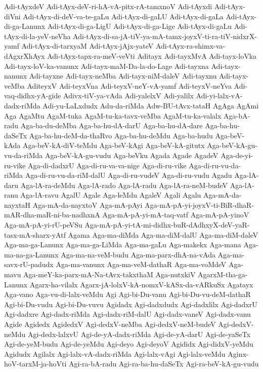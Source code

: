 {Adi-tAyxdeV
Adi-tAyx-deV-ri-hA-vA-pitx-rA-tamxnoV
Adi-tAyxdi
Adi-tAyx-diVni
Adi-tAyx-di-deV-va-te-gaLu
Adi-tAyx-di-gaLU
Adi-tAyx-di-gaLa
Adi-tAyx-di-ga-Lanunx
Adi-tAyx-di-ga-LigU
Adi-tAyx-di-ga-Lige
Adi-tAyx-di-gaLu
Adi-tAyx-di-la-yeV-neVha
Adi-tAyx-di-sa-jA-tiV-ya-mA-tamx-joyxV-ti-ra-tiV-nidxrX-yamf
Adi-tAyx-di-tarxyaM
Adi-tAyx-jAjx-yateV
Adi-tAyx-ra-shimx-va-dAgxrXhAyx
Adi-tAyx-tapx-ra-meV-veVti
Aditayx
Adi-tayxMvA
Adi-tayx-loVka
Adi-tayx-loV-ka-vanunx
Adi-tayx-maM-Da-la-do-Lage
Adi-tayxna
Adi-tayx-nanunx
Adi-tayxne
Adi-tayx-neMba
Adi-tayx-niM-daleV
Adi-tayxnu
Adi-tayx-veMba
AditeyxV
Adi-teyxVna
Adi-teyxV-neY-vA-yamf
Adi-teyxV-neYva
Adi-vaq-didhx-yA-gide
Adivx-tiV-ya-vAda
Adi-yalelxV
Adi-yalilx
Adi-yi-lalx-vA-dadx-riMda
Adi-yu-LaLxdudx
Adu-da-riMda
Adw-BU-tAvx-tataH
AgAga
AgAmi
Aga
AgaMtu
AgaM-tuka
AgaM-tu-ka-tavx-veMba
AgaM-tu-ka-valalx
Aga-bA-radu
Aga-ba-du-deMba
Aga-ba-hu-dA-darU
Aga-ba-hu-dA-dare
Aga-ba-hu-daSeTx
Aga-ba-hu-deM-da-thaRvo
Aga-ba-hu-deMdu
Aga-ba-hudu
Aga-beV-kAda
Aga-beV-kA-diV-teMdu
Aga-beV-kAgi
Aga-beV-kA-gitutx
Aga-beV-kA-gu-vu-da-riMda
Aga-beV-kA-gu-vudu
Aga-beVku
Agada
Agade
AgadeV
Aga-de-yi-ru-vike
Aga-di-dadxrU
Aga-di-ru-va-va-nige
Aga-di-ru-vike
Aga-di-ru-vu-da-riMda
Aga-di-ru-vu-da-riM-dalU
Aga-di-ru-vudeV
Aga-di-ru-vudu
Agadu
Aga-lA-daru
Aga-lA-ra-deMdu
Aga-lA-rado
Aga-lA-radu
Aga-lA-ra-neM-budeV
Aga-lA-ranu
Aga-lA-ravu
AgalU
Agale
Aga-leMdu
AgaleV
Agali
Agalu
Aga-mA-da-nayxtaH
Aga-mA-da-nayxtoV
Aga-mA-pAyi
Aga-mA-pA-yi-joyxV-ti-BiR-dhaR-mAR-dha-maR-ni-ba-nadhxnA
Aga-mA-pA-yi-mA-taq-vatf
Aga-mA-pA-yinoV
Aga-mA-pA-yi-rU-peVSu
Aga-mA-pA-yi-tA-mi-didhx-buR-dAdhxyX-deV-yaR-tasx-mA-sharx-yAtf
Agama
Aga-ma-diMda
Aga-ma-diM-dalU
Aga-ma-diM-daleV
Aga-ma-ga-Lanunx
Aga-ma-ga-LiMda
Aga-ma-gaLu
Aga-makekx
Aga-mana
Aga-ma-na-ga-Lanunx
Aga-ma-na-veM-budu
Aga-ma-parx-dhA-na-vAda
Aga-ma-savx-rU-padudx
Aga-ma-vanunx
Aga-ma-veM-dathaR
Aga-ma-voMdeV
Aga-mavu
Aga-meY-ka-parx-mA-Na-tAvx-takxthaM
Aga-nutxkiV
AgarxM-tha-ga-Lanunx
Agarx-ha-vilalx
Agarx-jA-lolxV-kA-nomxV-kASx-da-vARkuSx
Agatayx
Aga-vano
Aga-vu-di-lalx-veMdu
Agi
Agi-bi-Du-vanu
Agi-bi-Du-vu-deM-dathaR
Agi-bi-Du-vudu
Agi-bi-Du-vuvu
Agidadx
Agi-dadxdudx
Agi-dadxlilx
Agi-dadxrU
Agi-dadxre
Agi-dadx-riMda
Agi-dadx-riM-dalU
Agi-dadx-vaneV
Agi-dadx-vanu
Agide
Agidedx
AgidedxV
Agi-dedxV-neMba
Agi-dedxV-neM-budeV
Agi-dedxV-neMdu
Agi-dedx-lalxvU
Agi-de-yA-dadx-riMda
Agi-de-yA-darU
Agi-de-yaSeTx
Agi-de-yeM-budu
Agi-de-yeMdu
Agi-deyo
Agi-deyoV
Agididx
Agi-didxV-yeMdu
Agidudx
Agilalx
Agi-lalx-vA-dadx-riMda
Agi-lalx-vAgi
Agi-lalx-veMdu
Aginx-hoV-tarxM-ja-hoVti
Agi-ra-bA-radu
Agi-ra-ba-hu-daSeTx
Agi-ra-beV-kA-gu-vudu
}
